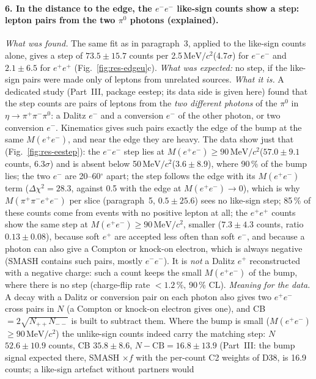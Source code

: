 \documentclass[11pt,a4paper]{article}
\newcommand{\piz}{\ensuremath{\pi^{0}}\xspace}
\newcommand{\pipi}{\ensuremath{\pi^{+}\pi^{-}}\xspace}
\newcommand{\Mfour}{\ensuremath{M(\pi^{+}\pi^{-}e^{+}e^{-})}\xspace}
\newcommand{\Mee}{\ensuremath{M(e^{+}e^{-})}\xspace}
\newcommand{\MeVcc}{\ensuremath{\mathrm{MeV}/c^{2}}\xspace}
\begin{document}
\paragraph{6. In the distance to the edge, the $e^-e^-$ like-sign counts show a step: lepton pairs from the two \piz photons (explained).}
\emph{What was found.} The same fit as in paragraph~3, applied to the like-sign counts alone, gives a step of $73.5\pm15.7$ counts per
2.5\,\MeVcc (4.7$\sigma$) for $e^-e^-$ and $2.1\pm6.5$ for $e^+e^+$ (Fig.~\ref{fig:res-edgeu}c). \emph{What was expected:} no step, if the
like-sign pairs were made only of leptons from unrelated sources. \emph{What it is.} A dedicated study (Part~III, package eestep; its data side
is given here) found that the step counts are pairs of leptons from the \emph{two different photons} of the \piz in $\eta\to\pipi\piz$: a Dalitz
$e^-$ and a conversion $e^-$ of the other photon, or two conversion $e^-$. Kinematics gives such pairs exactly the edge of the bump at the
same \Mee, and near the edge they are heavy. The data show just that (Fig.~\ref{fig:res-eestep}): the $e^-e^-$ step lies at
\Mee$\ge90$\,\MeVcc ($57.0\pm9.1$ counts, 6.3$\sigma$) and is absent below 50\,\MeVcc ($3.6\pm8.9$), where 90\,\% of the bump lies; the two
$e^-$ are 20--60$^\circ$ apart; the step follows the edge with its \Mee term ($\Delta\chi^2=28.3$, against 0.5 with the edge at
$\Mee\to0$), which is why \Mfour per slice (paragraph~5, $0.5\pm25.6$) sees no like-sign step; 85\,\% of these counts come from events with no
positive lepton at all; the $e^+e^+$ counts show the same step at \Mee$\ge90$\,\MeVcc, smaller ($7.3\pm4.3$ counts, ratio $0.13\pm0.08$), because
soft $e^+$ are accepted less often than soft $e^-$, and because a photon can also give a Compton or knock-on electron, which is always
negative (SMASH contains such pairs, mostly $e^-e^-$). It is \emph{not} a Dalitz $e^+$ reconstructed with a negative charge: such a count keeps the
small \Mee of the bump, where there is no step (charge-flip rate $<1.2$\,\%, 90\,\% CL). \emph{Meaning for the data.} A decay with a Dalitz or
conversion pair on each photon also gives two $e^+e^-$ cross pairs in $N$ (a Compton or knock-on electron gives one), and CB $=2\sqrt{N_{++}N_{--}}$
is built to subtract them. Where the bump is small (\Mee$\ge90$\,\MeVcc) the
unlike-sign counts indeed carry the matching step: $N$ $52.6\pm10.9$ counts, CB $35.8\pm8.6$, $N-\mathrm{CB}=16.8\pm13.9$ (Part~III: the bump
signal expected there, SMASH $\times f$ with the per-count C2 weights of D38, is 16.9 counts; a like-sign artefact without partners would
\end{document}
